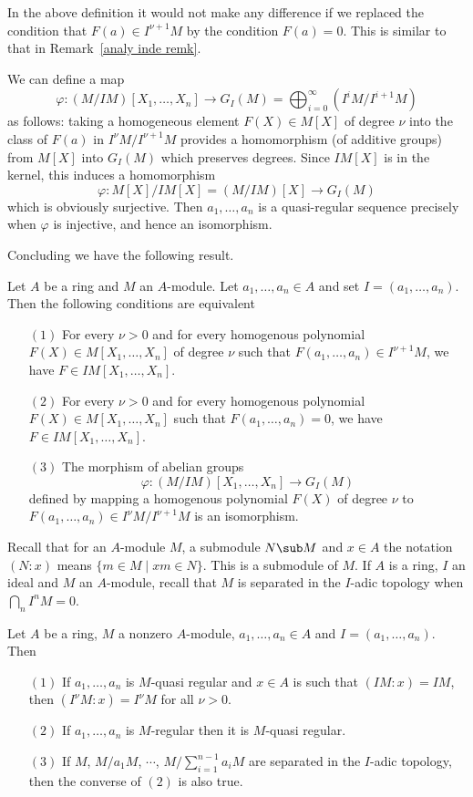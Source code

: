 In the above definition it would not make any difference if we replaced the condition that $F(a)\in I^{\nu+1}M$ by the condition $F(a)=0$. This is similar to that in Remark~\ref{analy inde remk}.\par
We can define a map 
\[\varphi:(M/IM)[X_1,\dots,X_n]\to G_I(M)=\bigoplus_{i=0}^{\infty}(I^iM/I^{i+1}M)\]
as follows: taking a homogeneous element $F(X)\in M[X]$ of degree $\nu$ into the class of $F(a)$ in $I^\nu M/I^{\nu+1}M$ provides a homomorphism (of additive groups) from $M[X]$ into $G_I(M)$ which preserves degrees. Since $IM[X]$ is in the kernel, this induces a homomorphism
\[\varphi:M[X]/IM[X]=(M/IM)[X]\to G_I(M)\]
which is obviously surjective. Then $a_1,\dots,a_n$ is a quasi-regular sequence precisely when $\varphi$ is injective, and hence an isomorphism.\par
Concluding we have the following result.
\begin{proposition}\label{quasi regular}
Let $A$ be a ring and $M$ an $A$-module. Let $a_1,\dots,a_n\in A$ and set $I=(a_1,\dots,a_n)$. Then the following conditions are equivalent
\begin{itemize}
\item[$(1)$]For every $\nu>0$ and for every homogenous polynomial $F(X)\in M[X_1,\dots,X_n]$ of degree $\nu$ such that $F(a_1,\dots,a_n)\in I^{\nu+1}M$, we have $F\in IM[X_1,\dots,X_n]$.
\item[$(2)$]For every $\nu>0$ and for every homogenous polynomial $F(X)\in M[X_1,\dots,X_n]$ such that $F(a_1,\dots,a_n)=0$, we have $F\in IM[X_1,\dots,X_n]$.
\item[$(3)$]The morphism of abelian groups 
\[\varphi:(M/IM)[X_1,\dots,X_n]\to G_I(M)\] 
defined by mapping a homogenous polynomial $F(X)$ of degree $\nu$ to $F(a_1,\dots,a_n)\in I^{\nu}M/I^{\nu+1}M$ is an isomorphism.
\end{itemize}
\end{proposition}
Recall that for an $A$-module $M$, a submodule $N\sub M$ and $x\in A$ the notation $(N:x)$ means $\{m\in M\mid xm\in N\}$. This is a submodule of $M$. If $A$ is a ring, $I$ an ideal and $M$ an $A$-module, recall that $M$ is separated in the $I$-adic topology when $\bigcap_nI^nM=0$.
\begin{proposition}
Let $A$ be a ring, $M$ a nonzero $A$-module, $a_1,\dots,a_n\in A$ and $I=(a_1,\dots,a_n)$. Then
\begin{itemize}
\item[$(1)$]If $a_1,\dots,a_n$ is $M$-quasi regular and $x\in A$ is such that $(IM:x)=IM$, then $(I^\nu M:x)=I^\nu M$ for all $\nu>0$.
\item[$(2)$]If $a_1,\dots,a_n$ is $M$-regular then it is $M$-quasi regular.
\item[$(3)$]If $M$, $M/a_1M$, $\cdots$, $M/\sum_{i=1}^{n-1}a_iM$ are separated in the $I$-adic topology, then the converse of $(2)$ is also true.
\end{itemize}
\end{proposition}
